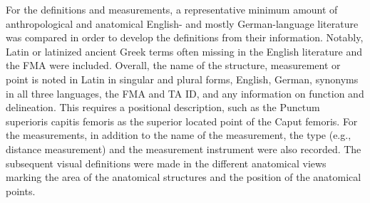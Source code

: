 \documentclass[sw]{iosart2x}
\begin{document}
For the definitions and measurements, a representative minimum amount of anthropological and anatomical English- and mostly German-language literature was compared in order to develop the definitions from their information.
Notably, Latin or latinized ancient Greek terms often missing in the English literature and the FMA were included.
Overall, the name of the structure, measurement or point is noted in Latin in singular and plural forms, English, German, synonyms in all three languages, the FMA and TA ID, and any information on function and delineation.
This requires a positional description, such as the Punctum superioris capitis femoris as the superior located point of the Caput femoris.
For the measurements, in addition to the name of the measurement, the type (e.g., distance measurement) and the measurement instrument were also recorded.
The subsequent visual definitions were made in the different anatomical views marking the area of the anatomical structures and the position of the anatomical points.
\end{document}
